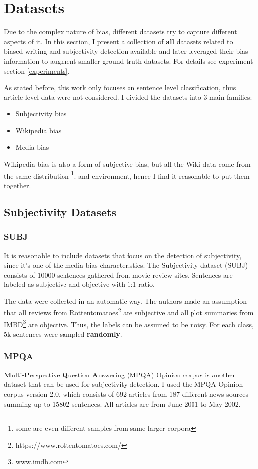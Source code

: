 \chapter{Datasets} \label{datasets}
Due to the complex nature of bias, different datasets try to capture different aspects of it. In this section, I present a collection of \textbf{all} datasets related to biased writing and subjectivity detection available and later leveraged their bias information to augment smaller ground truth datasets. For details see experiment section \ref{experiments}.

As stated before, this work only focuses on sentence level classification, thus article level data were not considered. I divided the datasets into 3 main families: 
\begin{itemize}
    \item Subjectivity bias
    \item Wikipedia bias
    \item Media bias
\end{itemize}
Wikipedia bias is also a form of subjective bias, but all the Wiki data come from the same distribution \footnote{some are even different samples from same larger corpora}. and environment, hence I find it reasonable to put them together.


\section{Subjectivity Datasets}

\subsection{SUBJ}
It is reasonable to include datasets that focus on the detection of subjectivity, since it's one of the media bias characteristics. The Subjectivity dataset (SUBJ) \cite{Pang+Lee:04a} consists of 10000 sentences gathered from movie review sites. Sentences are labeled as subjective and objective with 1:1 ratio. 

The data were collected in an automatic way. The authors made an assumption that all reviews from Rottentomatoes\footnote{https://www.rottentomatoes.com/} are subjective and all plot summaries from IMBD\footnote{ www.imdb.com} are objective. Thus, the labels can be assumed to be noisy. For each class, 5k sentences were sampled \textbf{randomly}.




\subsection{MPQA}
\textbf{M}ulti-\textbf{P}erspective \textbf{Q}uestion \textbf{A}nswering (MPQA) Opinion corpus is another dataset that can be used for subjectivity detection. I used the MPQA Opinion corpus version 2.0, which consists of 692 articles from 187 different news sources summing up to 15802 sentences. All articles are from June 2001 to May 2002.

